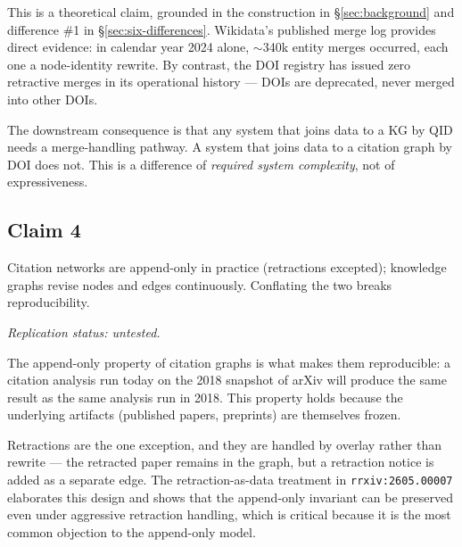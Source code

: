\documentclass{rrxiv}
\begin{document}

This is a theoretical claim, grounded in the construction in \S\ref{sec:background} and difference \#1 in \S\ref{sec:six-differences}. Wikidata's published merge log provides direct evidence: in calendar year 2024 alone, $\sim$340k entity merges occurred, each one a node-identity rewrite. By contrast, the DOI registry has issued zero retractive merges in its operational history --- DOIs are deprecated, never merged into other DOIs.

The downstream consequence is that any system that joins data to a KG by QID needs a merge-handling pathway. A system that joins data to a citation graph by DOI does not. This is a difference of \emph{required system complexity}, not of expressiveness.

\subsection*{Claim 4}
\begin{claim}[type=theoretical, evidence=argument, confidence=0.9, rationale={Structural argument about mutability commitments; the retraction exception is handled by overlay per rrxiv:2605.00007}, labels={citation-graphs, knowledge-graphs, position}, title={Append-only modulo retraction}]
\label{claim:c4}
Citation networks are append-only in practice (retractions excepted); knowledge graphs revise nodes and edges continuously. Conflating the two breaks reproducibility.

\emph{Replication status: untested.}
\end{claim}


The append-only property of citation graphs is what makes them reproducible: a citation analysis run today on the 2018 snapshot of arXiv will produce the same result as the same analysis run in 2018. This property holds because the underlying artifacts (published papers, preprints) are themselves frozen.

Retractions are the one exception, and they are handled by overlay rather than rewrite --- the retracted paper remains in the graph, but a retraction notice is added as a separate edge. The retraction-as-data treatment in \texttt{rrxiv:2605.00007} elaborates this design and shows that the append-only invariant can be preserved even under aggressive retraction handling, which is critical because it is the most common objection to the append-only model.
\end{document}
